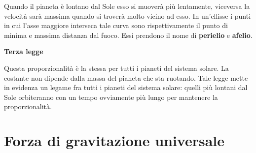 \documentclass[10pt,a4paper]{book}
\begin{document}
\FloatBarrier
Quando il pianeta è lontano dal Sole esso si muoverà più lentamente, viceversa la velocità sarà massima quando si troverà molto vicino ad esso. In un'ellisse i punti in cui l'asse maggiore interseca tale curva sono rispettivamente il punto di minima e massima distanza dal fuoco. Essi prendono il nome di \textbf{perielio} e \textbf{afelio}.

\textbf{Terza legge} 

\noindent{}

Questa proporzionalità è la stessa per tutti i pianeti del sistema solare. La costante non dipende dalla massa del pianeta che sta ruotando. Tale legge mette in evidenza un legame fra tutti i pianeti del sistema solare: quelli più lontani dal Sole orbiteranno con un tempo ovviamente più lungo per mantenere la proporzionalità.







































\section{Forza di gravitazione universale}
\end{document}
